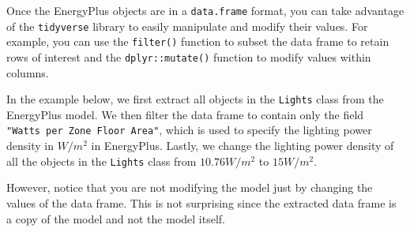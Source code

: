 \documentclass[
]{book}
\newenvironment{Shaded}{\begin{snugshade}}{\end{snugshade}}
\newcommand{\AttributeTok}[1]{\textcolor[rgb]{0.77,0.63,0.00}{#1}}
\newcommand{\CommentTok}[1]{\textcolor[rgb]{0.56,0.35,0.01}{\textit{#1}}}
\newcommand{\DocumentationTok}[1]{\textcolor[rgb]{0.56,0.35,0.01}{\textbf{\textit{#1}}}}
\newcommand{\FunctionTok}[1]{\textcolor[rgb]{0.00,0.00,0.00}{#1}}
\newcommand{\NormalTok}[1]{#1}
\newcommand{\OtherTok}[1]{\textcolor[rgb]{0.56,0.35,0.01}{#1}}
\newcommand{\SpecialCharTok}[1]{\textcolor[rgb]{0.00,0.00,0.00}{#1}}
\newcommand{\StringTok}[1]{\textcolor[rgb]{0.31,0.60,0.02}{#1}}
\begin{document}
Once the EnergyPlus objects are in a \texttt{data.frame} format, you can take advantage of the \texttt{tidyverse} library to easily manipulate and modify their values. For example, you can use the \texttt{filter()} function to subset the data frame to retain rows of interest and the \texttt{dplyr::mutate()} function to modify values within columns.

In the example below, we first extract all objects in the \texttt{Lights} class from the EnergyPlus model. We then filter the data frame to contain only the field \texttt{"Watts\ per\ Zone\ Floor\ Area"}, which is used to specify the lighting power density in \(W/m^2\) in EnergyPlus. Lastly, we change the lighting power density of all the objects in the \texttt{Lights} class from \(10.76 W/m^2\) to \(15 W/m^2\).

\begin{Shaded}
\end{Shaded}

However, notice that you are not modifying the model just by changing the values of the data frame. This is not surprising since the extracted data frame is a copy of the model and not the model itself.
\end{document}
